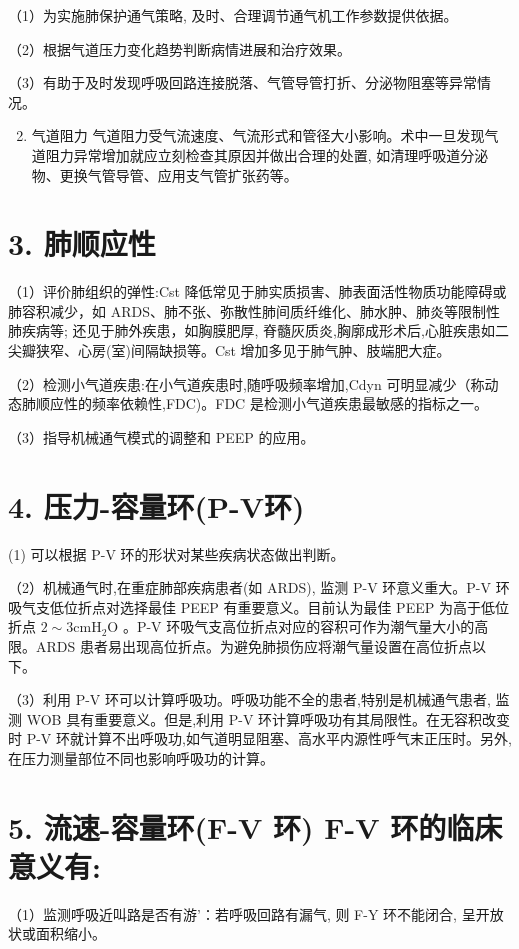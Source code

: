 \documentclass[10pt]{article}
\begin{document}
（1）为实施肺保护通气策略, 及时、合理调节通气机工作参数提供依据。

（2）根据气道压力变化趋势判断病情进展和治疗效果。

（3）有助于及时发现呼吸回路连接脱落、气管导管打折、分泌物阻塞等异常情况。

\begin{enumerate}
  \setcounter{enumi}{1}
  \item 气道阻力 气道阻力受气流速度、气流形式和管径大小影响。术中一旦发现气道阻力异常增加就应立刻检查其原因并做出合理的处置, 如清理呼吸道分泌物、更换气管导管、应用支气管扩张药等。
\end{enumerate}

\section*{3. 肺顺应性}
（1）评价肺组织的弹性:Cst 降低常见于肺实质损害、肺表面活性物质功能障碍或肺容积减少，如 ARDS、肺不张、弥散性肺间质纤维化、肺水肿、肺炎等限制性肺疾病等; 还见于肺外疾患，如胸膜肥厚, 脊髓灰质炎,胸廓成形术后,心脏疾患如二尖瓣狭窄、心房(室)间隔缺损等。Cst 增加多见于肺气肿、肢端肥大症。

（2）检测小气道疾患:在小气道疾患时,随呼吸频率增加,Cdyn 可明显减少（称动态肺顺应性的频率依赖性,FDC)。FDC 是检测小气道疾患最敏感的指标之一。

（3）指导机械通气模式的调整和 PEEP 的应用。

\section*{4. 压力-容量环(P-V环)}
(1) 可以根据 P-V 环的形状对某些疾病状态做出判断。

（2）机械通气时,在重症肺部疾病患者(如 ARDS), 监测 P-V 环意义重大。P-V 环吸气支低位折点对选择最佳 PEEP 有重要意义。目前认为最佳 PEEP 为高于低位折点 $2 \sim 3 \mathrm{cmH}_{2} \mathrm{O}$ 。P-V 环吸气支高位折点对应的容积可作为潮气量大小的高限。ARDS 患者易出现高位折点。为避免肺损伤应将潮气量设置在高位折点以下。

（3）利用 P-V 环可以计算呼吸功。呼吸功能不全的患者,特别是机械通气患者, 监测 WOB 具有重要意义。但是,利用 P-V 环计算呼吸功有其局限性。在无容积改变时 P-V 环就计算不出呼吸功,如气道明显阻塞、高水平内源性呼气末正压时。另外,在压力测量部位不同也影响呼吸功的计算。

\section*{5. 流速-容量环(F-V 环) F-V 环的临床意义有:}
（1）监测呼吸近叫路是否有游'：若呼吸回路有漏气, 则 F-Y 环不能闭合, 呈开放状或面积缩小。
\end{document}
